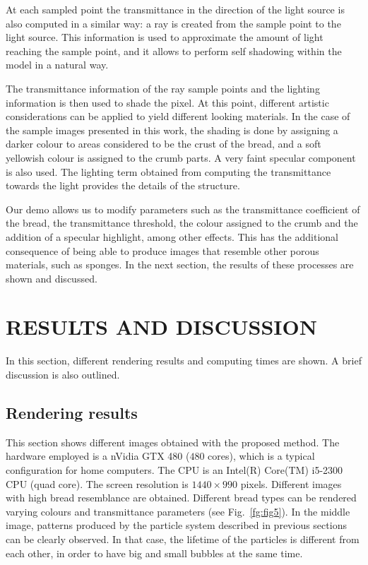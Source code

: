 \documentclass[oneside,a4paper,english,links]{amca}
\begin{document}
At each sampled point the transmittance in the direction of the light
source is also computed in a similar way: a ray is created from the
sample point to the light source. This information is used to
approximate the amount of light reaching the sample point, and it
allows to perform self shadowing within the model in a natural
way. 

The transmittance information of the ray sample points and the
lighting information is then used to shade the pixel. At this point,
different artistic considerations can be applied to yield different
looking materials. In the case of the sample images presented
in this work, the shading is done by assigning a darker colour to areas
considered to be the crust of the bread, and a soft yellowish colour is
assigned to the crumb parts. A very faint specular component is also
used. The lighting term obtained from computing the transmittance
towards the light provides the details of the structure.

Our demo allows us to modify parameters such as the
transmittance coefficient of the bread, the transmittance threshold,
the colour assigned to the crumb and the addition of a specular
highlight, among other effects. This has the additional consequence of
being able to produce images that resemble other porous materials,
such as sponges. In the next section, the results of these processes
are shown and discussed.

\section{RESULTS AND DISCUSSION}

In this section, different rendering results and computing times are shown. A brief discussion is also outlined.

\subsection{Rendering results}

This section shows different images obtained with the proposed
method. The hardware employed is a nVidia GTX 480 ($480$ cores), which
is a typical configuration for home computers. The CPU is an Intel(R)
Core(TM) i5-2300 CPU (quad core). The screen resolution is
$1440\times990$ pixels. Different images with high bread resemblance
are obtained. Different bread types can be rendered varying colours
and transmittance parameters (see Fig.~\ref{fg:fig5}). In the middle
image, patterns produced by the particle system described in previous
sections can be clearly observed. In that case, the lifetime of the
particles is different from each other, in order to have big and small
bubbles at the same time. 
\end{document}
